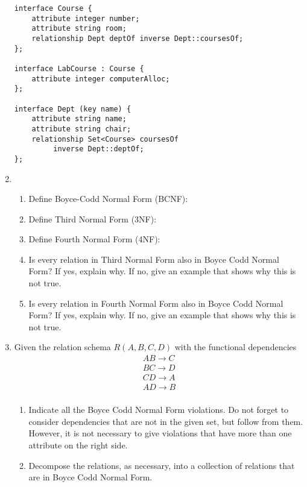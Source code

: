 \documentclass[12pt]{article}
\begin{document}
\begin{enumerate}
\begin{verbatim}
interface Course {
    attribute integer number;
    attribute string room;
    relationship Dept deptOf inverse Dept::coursesOf;
};

interface LabCourse : Course {
    attribute integer computerAlloc;
};

interface Dept (key name) {
    attribute string name;
    attribute string chair;
    relationship Set<Course> coursesOf
         inverse Dept::deptOf;
};
\end{verbatim}

\newpage


\newpage
\item 
    \begin{enumerate} 
	\item Define Boyce-Codd Normal Form (BCNF):
	    \vspace{1in}
	\item Define Third Normal Form (3NF):
	    \vspace{1in}
	\item Define Fourth Normal Form (4NF):
	    \vspace{1in}
        \item Is every relation in Third Normal Form also in Boyce Codd
	    Normal Form?  If yes, explain why.  If no, give an example
	    that shows why this is not true.
	    \vspace{1.75in}
        \item Is every relation in Fourth Normal Form also in Boyce Codd
	    Normal Form?  If yes, explain why.  If no, give an example
	    that shows why this is not true.
	    \vspace{1.5in}
    \end{enumerate} 

\newpage

\item Given the relation schema $R(A,B,C,D)$ with the functional dependencies
$$
\begin{array}{c}
	AB \rightarrow C\\
	BC \rightarrow D\\
	CD \rightarrow A\\
	AD \rightarrow B\\
\end{array}
$$
\begin{enumerate}
    \item Indicate all the Boyce Codd Normal Form violations.  
	Do not forget to consider
	dependencies that are not in the given set, but follow from them.
	However, it is not necessary to give violations that have more than
	one attribute on the right side.
	\vspace{2.5in}
    \item Decompose the relations, as necessary, into a collection of 
	relations that are in Boyce Codd Normal Form.
	\vspace{2in}
\end{enumerate}


\end{enumerate}
\end{document}
